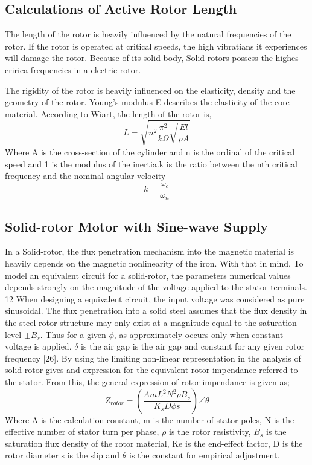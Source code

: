 \subsection{Calculations of Active Rotor Length} %

The length of the rotor is heavily influenced by the natural frequencies of the rotor. If
the rotor is operated at critical speeds, the high vibratians it experiences will damage
the rotor. Because of its solid body, Solid rotors possess the highes cririca
frequencies in a electric rotor.

The rigidity of the rotor is heavily influenced on the elasticity, density and the
geometry of the rotor. Young's modulus E describes the elasticity of the core
material. According to Wiart, the length of the rotor is,
%
\begin{equation}\label{eq:2.6}
L = \sqrt{n^2 \frac{\pi^2}{k\Omega} \sqrt{\frac{El}{\rho A}}}
\end{equation}
%
Where A is the cross-section of the cylinder and n is the ordinal of the critical
speed and 1 is the modulus of the inertia.k is the ratio between the nth critical
frequency and the nominal angular velocity
%
\begin{equation}\label{eq:2.7}
k = \frac{\omega_c}{\omega_n}
\end{equation}
%

\subsection{Solid-rotor Motor with Sine-wave Supply} %

In a Solid-rotor, the flux penetration mechanism into the magnetic material is
heavily depends on the magnetic nonlinearity of the iron. With that in mind, To
model an equivalent circuit for a solid-rotor, the parameters numerical values
depends strongly on the magnitude of the voltage applied to the stator terminals.
12
When designing a equivalent circuit, the input voltage was considered as pure
sinusoidal.
The flux penetration into a solid steel assumes that the flux density in the steel
rotor structure may only exist at a magnitude equal to the saturation level $\pm B_s$. Thus
for a given $\phi$, as approximately occurs only when constant voltage is applied. $\delta$ is the
air gap is the air gap and constant for any given rotor frequency [26]. By using the
limiting non-linear representation in the analysis of solid-rotor gives and expression
for the equivalent rotor impendance referred to the stator. From this, the general
expression of rotor impendance is given as;
%
\begin{equation}\label{eq:2.8}
Z_{rotor} = \left(\frac{AmL^2N^2\rho B_s}{K_sD\phi s}\right) \angle \theta
\end{equation}
%
Where A is the calculation constant, m is the number of stator poles, N is the
effective number of stator turn per phase, $\rho$ is the rotor resistivity, $B_s$ is the saturation
flux density of the rotor material, Ke is the end-effect factor, D is the rotor diameter s
is the slip and $\theta$ is the constant for empirical adjustment.

